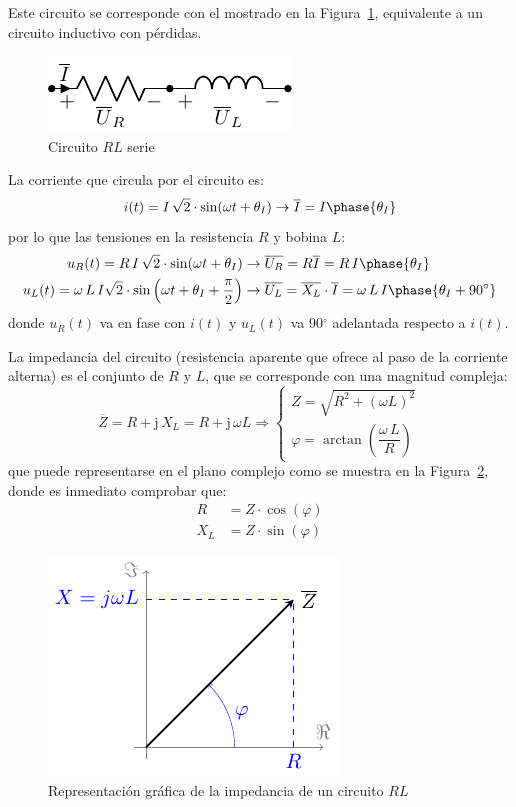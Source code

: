 Este circuito se corresponde con el mostrado en la
Figura~\ref{fig:RL}, equivalente a un circuito inductivo con pérdidas.
\begin{figure}[H]
  \centering \includegraphics[width=0.3\linewidth]{../figs/RL.pdf}
  \caption{Circuito $RL$ serie}
  \label{fig:RL}
\end{figure}
	
La corriente que circula por el circuito es:
\begin{equation*}
  i(t)=I\,\sqrt{2}\cdot\sin(\omega t+\theta_I)\rightarrow\overline{I}=I\phase{\theta_I}
\end{equation*}
por lo que las tensiones en la resistencia $R$ y bobina $L$:
\begin{align*}
  u_R(t)=R\, I\,\sqrt{2}\cdot\sin(\omega t+\theta_I)&\rightarrow \overline{U_R} = R \overline{I}=R\,I\phase{\theta_I}\\ 
  u_L(t)= \omega\,L\,I \sqrt{2}\cdot \sin \left(\omega t+\theta_I+\frac{\pi}{2}\right)&\rightarrow \overline{U_L}=\overline{X_L}\cdot\overline{I}= \omega\,L\,I\phase{\theta_I+90^\circ}
\end{align*}
donde $u_R(t)$ va en fase con $i(t)$ y $u_L(t)$ va 90$^\circ$
adelantada respecto a $i(t)$.
	
La impedancia del circuito (resistencia aparente que ofrece al paso de
la corriente alterna) es el conjunto de $R$ y $L$, que se corresponde
con una magnitud compleja:
\begin{equation}
  \boxed{ \overline{Z} = R + \mathrm{j}\,X_L = R+ \mathrm{j}\,\omega L \Rightarrow 
    \begin{cases}
      Z=\sqrt{R^2+(\omega L)^2}\\
      \varphi=\arctan\left(\dfrac{\omega\,L}{R} \right)
    \end{cases}}
\end{equation}
que puede representarse en el plano complejo como se muestra en la
Figura~\ref{fig:fasorinductanciareal}, donde es inmediato comprobar
que:
\begin{align*}
  R&=Z\cdot\cos(\varphi)\\
  X_L&=Z\cdot\sin(\varphi)
\end{align*} 
\begin{figure}[H]
  \centering \includegraphics{../figs/fasorInductanciaReal.pdf}
  \caption{Representación gráfica de la impedancia de un circuito
    $RL$}
  \label{fig:fasorinductanciareal}
\end{figure}
	
